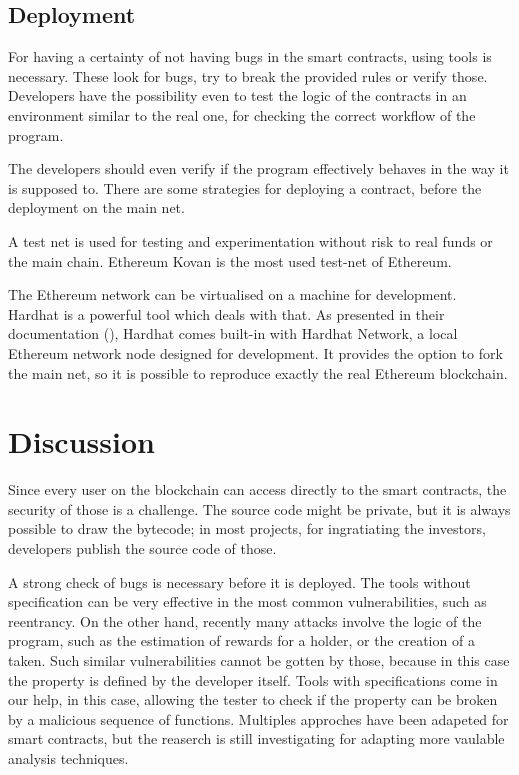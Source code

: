 \documentclass[a4paper,sigconf, language=french,
language=german, language=spanish, language=english]{acmart}
\begin{document}
\subsection{Deployment}
For having a certainty of not having bugs in the smart contracts, using tools is necessary. These look for bugs, try to break the provided rules or verify those. Developers have the possibility even to test the logic of the contracts in an environment similar to the real one, for checking the correct workflow of the program. 

The developers should even verify if the program effectively behaves in the way it is supposed to. There are some strategies for deploying a contract, before the deployment on the main net.

A test net is used for testing and experimentation without risk to real funds or the main chain. Ethereum Kovan is the most used test-net of Ethereum. 

The Ethereum network can be virtualised on a machine for development. Hardhat is a powerful tool which deals with that. As presented in their documentation (\cite{Hardhat}), Hardhat comes built-in with Hardhat Network, a local Ethereum network node designed for development. It provides the option to fork the main net, so it is possible to reproduce exactly the real  Ethereum blockchain.


\section{Discussion}
\label{Discussion}

Since every user on the blockchain can access directly to the smart contracts, the security of those is a challenge. The source code might be private, but it is always possible to draw the bytecode; in most projects, for ingratiating the investors, developers publish the source code of those.  

A strong check of bugs is necessary before it is deployed. The tools without specification can be very effective in the most common vulnerabilities, such as reentrancy. On the other hand, recently many attacks involve the logic of the program, such as the estimation of rewards for a holder, or the creation of a taken. Such similar vulnerabilities cannot be gotten by those, because in this case the property is defined by the developer itself. Tools with specifications come in our help, in this case, allowing the tester to check if the property can be broken by a malicious sequence of functions. Multiples approches have been adapeted for smart contracts, but the reaserch is still investigating for adapting more vaulable analysis techniques.
\end{document}
